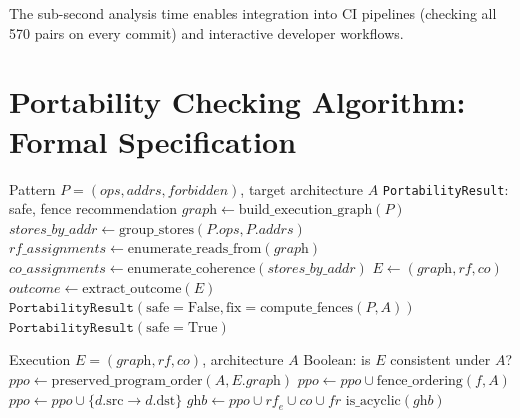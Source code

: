 \documentclass[10pt]{article}
\newcommand{\po}{\ensuremath{\xrightarrow{\text{po}}}}
\begin{document}
The sub-second analysis time enables integration into CI pipelines
(checking all 570 pairs on every commit) and interactive developer
workflows.

\section{Portability Checking Algorithm: Formal Specification}
\label{app:algorithm}

\begin{algorithm}[H]
\caption{Cross-Architecture Portability Check}
\label{alg:portcheck}
\begin{algorithmic}[1]
\REQUIRE Pattern $P = (\textit{ops}, \textit{addrs}, \textit{forbidden})$, target architecture $A$
\ENSURE \texttt{PortabilityResult}: safe, fence recommendation
\STATE $\textit{graph} \gets \text{build\_execution\_graph}(P)$
\STATE $\textit{stores\_by\_addr} \gets \text{group\_stores}(P.\textit{ops}, P.\textit{addrs})$
\STATE $\textit{rf\_assignments} \gets \text{enumerate\_reads\_from}(\textit{graph})$
\STATE $\textit{co\_assignments} \gets \text{enumerate\_coherence}(\textit{stores\_by\_addr})$
    \STATE $E \gets (\textit{graph}, \textit{rf}, \textit{co})$
        \STATE $\textit{outcome} \gets \text{extract\_outcome}(E)$
            \RETURN $\texttt{PortabilityResult}(\text{safe}=\text{False},
                    \text{fix}=\text{compute\_fences}(P, A))$
        \ENDIF
    \ENDIF
\ENDFOR
\RETURN $\texttt{PortabilityResult}(\text{safe}=\text{True})$
\end{algorithmic}
\end{algorithm}

\begin{algorithm}[H]
\caption{Architecture Consistency Check}
\label{alg:consistent}
\begin{algorithmic}[1]
\REQUIRE Execution $E = (\textit{graph}, \textit{rf}, \textit{co})$, architecture $A$
\ENSURE Boolean: is $E$ consistent under $A$?
\STATE $\textit{ppo} \gets \text{preserved\_program\_order}(A, E.\textit{graph})$
\COMMENT{Filter $\po$ by $A$'s relaxations}
    \STATE $\textit{ppo} \gets \textit{ppo} \cup \text{fence\_ordering}(f, A)$
\ENDFOR
{}
        \STATE $\textit{ppo} \gets \textit{ppo} \cup \{d.\text{src} \to d.\text{dst}\}$
    \ENDIF
\ENDFOR
\STATE $\textit{ghb} \gets \textit{ppo} \cup \textit{rf}_e \cup \textit{co} \cup \textit{fr}$
\RETURN $\text{is\_acyclic}(\textit{ghb})$
\end{algorithmic}
\end{algorithm}
\end{document}

